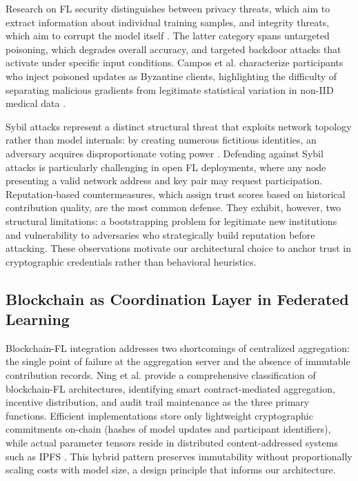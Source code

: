 \documentclass[english]{sbc2025}
\begin{document}
Research on FL security distinguishes between privacy threats, which aim to extract information about individual training samples, and integrity threats, which aim to corrupt the model itself \citep{jimenez2025security}. The latter category spans untargeted poisoning, which degrades overall accuracy, and targeted backdoor attacks that activate under specific input conditions. Campos et al. \citep{campos2025flaegis} characterize participants who inject poisoned updates as Byzantine clients, highlighting the difficulty of separating malicious gradients from legitimate statistical variation in non-IID medical data \citep{10.1145/3678182}.

Sybil attacks represent a distinct structural threat that exploits network topology rather than model internals: by creating numerous fictitious identities, an adversary acquires disproportionate voting power \citep{10.1007/978-981-99-7032-2_3}. Defending against Sybil attacks is particularly challenging in open FL deployments, where any node presenting a valid network address and key pair may request participation. Reputation-based countermeasures, which assign trust scores based on historical contribution quality, are the most common defense. They exhibit, however, two structural limitations: a bootstrapping problem for legitimate new institutions and vulnerability to adversaries who strategically build reputation before attacking. These observations motivate our architectural choice to anchor trust in cryptographic credentials rather than behavioral heuristics.

\subsection{Blockchain as Coordination Layer in Federated Learning}

Blockchain-FL integration addresses two shortcomings of centralized aggregation: the single point of failure at the aggregation server and the absence of immutable contribution records. Ning et al. \citep{ning2024blockchain} provide a comprehensive classification of blockchain-FL architectures, identifying smart contract-mediated aggregation, incentive distribution, and audit trail maintenance as the three primary functions. Efficient implementations store only lightweight cryptographic commitments on-chain (hashes of model updates and participant identifiers), while actual parameter tensors reside in distributed content-addressed systems such as IPFS \citep{technologies12090168}. This hybrid pattern preserves immutability without proportionally scaling costs with model size, a design principle that informs our architecture.
\end{document}
